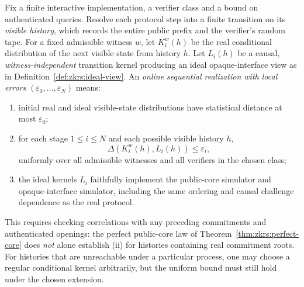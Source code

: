 \begin{definition}\label{def:zkrs:realization}
Fix a finite interactive implementation, a verifier class and
a bound on authenticated queries. Resolve each protocol step into
a finite transition on its \emph{visible history}, which records the
entire public prefix and the verifier's random tape.
For a fixed admissible witness $w$, let
$K_i^w(h)$ be the real conditional distribution
of the next visible state from history $h$.
Let $L_i(h)$ be a causal, \emph{witness-independent}
transition kernel producing an ideal opaque-interface
view as in Definition~\ref{def:zkrs:ideal-view}.
An \emph{online sequential realization with local errors}
$(\varepsilon_0,\ldots,\varepsilon_N)$ means:
\begin{enumerate}[label=\textup{(\roman*)}]
\item initial real and ideal visible-state distributions
have statistical distance at most $\varepsilon_0$;
\item for each stage $1\leq i\leq N$ and each possible
visible history $h$,
\[
 \Delta(K_i^w(h),L_i(h))\leq\varepsilon_i,
\]
uniformly over all admissible witnesses and
all verifiers in the chosen class;
\item the ideal kernels $L_i$ faithfully implement
the public-core simulator and opaque-interface
simulator, including the same ordering and
causal challenge dependence as the real protocol.
\end{enumerate}
This requires checking correlations with any
preceding commitments and authenticated openings:
the perfect public-core law of
Theorem~\ref{thm:zkrs:perfect-core}
does \emph{not} alone establish (ii)
for histories containing real commitment roots.
For histories that are unreachable under a
particular process, one may choose a regular
conditional kernel arbitrarily, but the uniform
bound must still hold under the chosen extension.
\end{definition}

